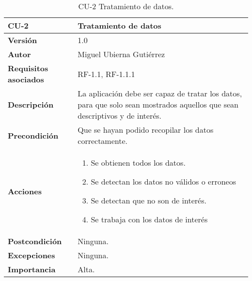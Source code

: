 \begin{table}[p]
	\centering
	\begin{tabularx}{\linewidth}{ p{} p{} }
		\toprule
		\textbf{CU-2}    & \textbf{Tratamiento de datos}\\
		\toprule
		\textbf{Versión}              & 1.0    \\
		\textbf{Autor}                & Miguel Ubierna Gutiérrez \\
		\textbf{Requisitos asociados} & RF-1.1, RF-1.1.1 \\
		\textbf{Descripción}          & La aplicación debe ser capaz de tratar los datos, para que solo sean mostrados aquellos que sean descriptivos y de interés. \\
		\textbf{Precondición}         & Que se hayan podido recopilar los datos correctamente. \\
		\textbf{Acciones}             &
		\begin{enumerate}
			\def\labelenumi{\arabic{enumi}.}
			\tightlist
			\item Se obtienen todos los datos.
			\item Se detectan los datos no válidos o erroneos
                \item Se detectan que no son de interés.
                \item Se trabaja con los datos de interés
		\end{enumerate}\\
		\textbf{Postcondición}        & Ninguna. \\
		\textbf{Excepciones}          & Ninguna. \\
		\textbf{Importancia}          & Alta.  \\
		\bottomrule
	\end{tabularx}
	\caption{CU-2 Tratamiento de datos.}
\end{table}


